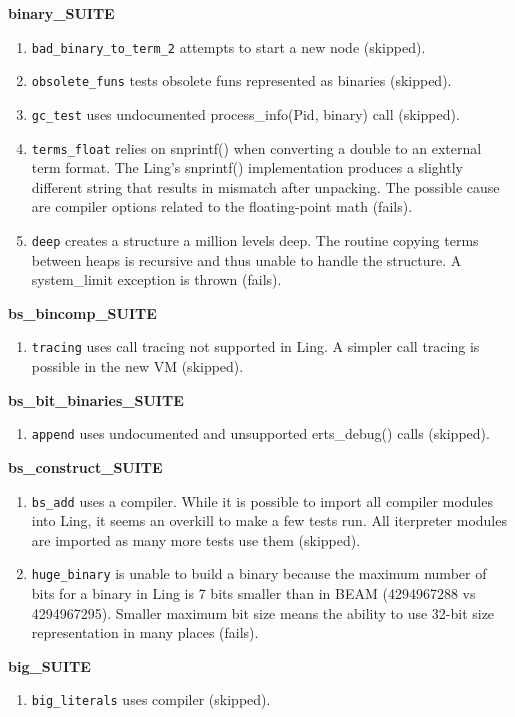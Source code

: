 \documentclass{article}
\begin{document}
\textbf{binary\_SUITE}
\begin{enumerate}
\item \texttt{bad\_binary\_to\_term\_2} attempts to start a new node (skipped).
\item \texttt{obsolete\_funs} tests obsolete funs represented as binaries (skipped).
\item \texttt{gc\_test} uses undocumented process\_info(Pid, binary) call (skipped).
\item \texttt{terms\_float} relies on snprintf() when converting a double to an
external term format. The Ling's snprintf() implementation produces a slightly
different string that results in mismatch after unpacking. The possible cause
are compiler options related to the floating-point math (fails).
\item \texttt{deep} creates a structure a million levels deep. The routine
copying terms between heaps is recursive and thus unable to handle the
structure. A system\_limit exception is thrown (fails).
\end{enumerate}

\textbf{bs\_bincomp\_SUITE}
\begin{enumerate}
\item \texttt{tracing} uses call tracing not supported in Ling. A simpler call tracing
is possible in the new VM (skipped).
\end{enumerate}

\textbf{bs\_bit\_binaries\_SUITE}
\begin{enumerate}
\item \texttt{append} uses undocumented and unsupported erts\_debug() calls (skipped).
\end{enumerate}

\textbf{bs\_construct\_SUITE}
\begin{enumerate}
\item \texttt{bs\_add} uses a compiler. While it is possible to import all
compiler modules into Ling, it seems an overkill to make a few tests run. All
iterpreter modules are imported as many more tests use them (skipped).
\item \texttt{huge\_binary} is unable to build a binary because the maximum
number of bits for a binary in Ling is 7 bits smaller than in BEAM (4294967288
vs 4294967295). Smaller maximum bit size means the ability to use 32-bit size
representation in many places (fails).
\end{enumerate}

\textbf{big\_SUITE}
\begin{enumerate}
\item \texttt{big\_literals} uses compiler (skipped).
\end{enumerate}
\end{document}

